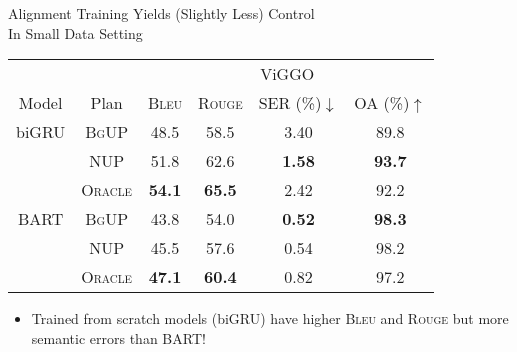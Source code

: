 \begin{frame}{Alignment Training Yields (Slightly Less) Control\\
        In Small Data Setting}

        \begin{tabular}{cccccc}
            \toprule
            & & \multicolumn{4}{c}{ViGGO} \\
            \cmidrule(lr){3-6} 
          Model & Plan & \textsc{Bleu} & \textsc{Rouge} & SER (\%)$\downarrow$ & OA (\%)$\uparrow$ \\
            \midrule
    biGRU & \textsc{BgUP} & 48.5 & 58.5 & 3.40 & 89.8 \\
          & \textsc{NUP} & 51.8 & 62.6 & \textbf{1.58} & \textbf{93.7} \\
          & \textsc{Oracle} & \textbf{54.1} & \textbf{65.5} & 2.42 & 92.2 \\
            \midrule
            BART & \textsc{BgUP} & 43.8 & 54.0 & \textbf{0.52} & \textbf{98.3} \\
          & \textsc{NUP} & 45.5 & 57.6 & 0.54 & 98.2 \\
          & \textsc{Oracle} & \textbf{47.1} & \textbf{60.4} & 0.82 & 97.2 \\
            \bottomrule
        \end{tabular}
        \begin{itemize}
            \item Trained from scratch models (biGRU) have higher \textsc{Bleu} and \textsc{Rouge} but more semantic errors than BART!
        \end{itemize}
\end{frame}


